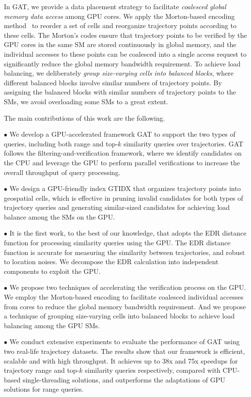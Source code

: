 \documentclass[10pt,conference,letterpaper]{IEEEtran}
\newcommand{\frname}{GAT\xspace }
\newcommand{\idxname}{GTIDX\xspace }
\begin{document}
In \frname, we provide a data placement strategy to facilitate \emph{coalesced global memory data access} among GPU cores.
We apply the Morton-based encoding method~\cite{morton1966computer} to reorder a set of cells and reorganize trajectory points according to these cells.
The Morton's codes ensure that trajectory points to be verified by the GPU cores in the same SM are stored continuously in global memory, and the individual accesses to these points can be coalesced into a single access request to significantly reduce the global memory bandwidth requirement.
To achieve load balancing, we deliberately \emph{group size-varying cells into balanced blocks}, where different balanced blocks involve similar numbers of trajectory points. By assigning the balanced blocks with similar numbers of trajectory points to the SMs, we avoid overloading some SMs to a great extent.


The main contributions of this work are the following.


$\bullet$ We develop a GPU-accelerated framework \frname to support the two types of queries, including both range and top-$k$ similarity queries over trajectories. \frname follows the filtering-and-verification framework, where we identify candidates on the CPU and leverage the GPU to perform parallel verifications to increase the overall throughput of query processing.

$\bullet$ We design a GPU-friendly index \idxname that organizes trajectory points into geospatial cells, which is effective in pruning invalid candidates for both types of trajectory queries and generating similar-sized candidates for achieving load balance among the SMs on the GPU.

$\bullet$ It is the first work, to the best of our knowledge, that adopts the EDR distance function for processing similarity queries using the GPU. The EDR distance function is accurate for measuring the similarity between trajectories, and robust to location noises. We decompose the EDR calculation into independent components to exploit the GPU.

$\bullet$ We propose two techniques of accelerating the verification process on the GPU. We employ the Morton-based encoding to facilitate coalesced individual accesses from cores to reduce the global memory bandwidth requirement. And we propose a technique of grouping size-varying cells into balanced blocks to achieve load balancing among the GPU SMs.

$\bullet$ We conduct extensive experiments to evaluate the performance of \frname using two real-life trajectory datasets. The results show that
our framework is efficient, scalable and with high throughput. It achieves up to 38x and 75x speedups for trajectory range and top-$k$ similarity queries respectively, compared with CPU-based single-threading solutions, and outperforms the adaptations of GPU solutions for range queries.
\end{document}
